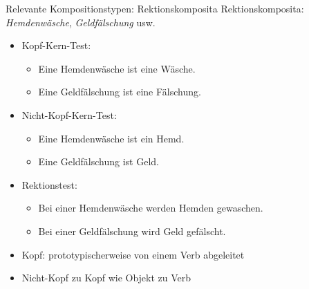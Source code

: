 \begin{frame}
  {Relevante Kompositionstypen: Rektionskomposita}
  \pause
  Rektionskomposita: \textit{Hemdenwäsche}, \textit{Geldfälschung} usw.
  \pause
  \Halbzeile
  \begin{itemize}[<+->]
    \item Kopf-Kern-Test:
      \begin{itemize}[<+->]
        \item Eine Hemdenwäsche ist eine Wäsche. \Ck
        \item Eine Geldfälschung ist eine Fälschung. \Ck
      \end{itemize}
    \item Nicht-Kopf-Kern-Test:
      \begin{itemize}[<+->]
        \item Eine Hemdenwäsche ist ein Hemd. \Fl
        \item Eine Geldfälschung ist Geld. \Fl
      \end{itemize}
      \Halbzeile
    \item Rektionstest:
      \begin{itemize}[<+->]
        \item \alert{Bei einer Hemdenwäsche werden Hemden gewaschen. \Ck}
        \item \alert{Bei einer Geldfälschung wird Geld gefälscht. \Ck}
      \end{itemize}
      \Halbzeile
    \item Kopf: prototypischerweise von einem Verb abgeleitet
    \item Nicht-Kopf zu Kopf wie Objekt zu Verb
  \end{itemize}
\end{frame}

